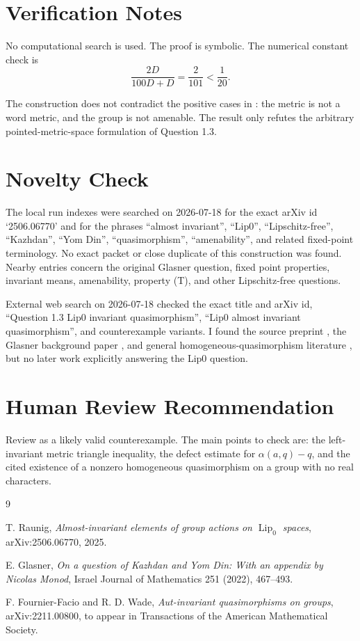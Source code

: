 \documentclass[11pt]{article}
\newcommand{\Lipz}{\operatorname{Lip}_0}
\begin{document}
\section{Verification Notes}

No computational search is used.  The proof is symbolic.  The numerical
constant check is
\[
  \frac{2D}{100D+D}=\frac2{101}<\frac1{20}.
\]

The construction does not contradict the positive cases in
\cite{Raunig2025}: the metric is not a word metric, and the group is not
amenable.  The result only refutes the arbitrary pointed-metric-space
formulation of Question 1.3.

\section{Novelty Check}

The local run indexes were searched on 2026-07-18 for the exact arXiv id
`2506.06770' and for the phrases ``almost invariant'', ``Lip0'',
``Lipschitz-free'', ``Kazhdan'', ``Yom Din'', ``quasimorphism'',
``amenability'', and related fixed-point terminology.  No exact packet or
close duplicate of this construction was found.  Nearby entries concern
the original Glasner question, fixed point properties, invariant means,
amenability, property (T), and other Lipschitz-free questions.

External web search on 2026-07-18 checked the exact title and arXiv id,
``Question 1.3 Lip0 invariant quasimorphism'', ``Lip0 almost invariant
quasimorphism'', and counterexample variants.  I found the source
preprint \cite{Raunig2025}, the Glasner background paper \cite{Glasner2022},
and general homogeneous-quasimorphism literature \cite{FournierFacioWade2023},
but no later work explicitly answering the Lip0 question.

\section{Human Review Recommendation}

Review as a likely valid counterexample.  The main points to check are:
the left-invariant metric triangle inequality, the defect estimate for
$\alpha(a,q)-q$, and the cited existence of a nonzero homogeneous
quasimorphism on a group with no real characters.

\begin{thebibliography}{9}

T. Raunig,
\emph{Almost-invariant elements of group actions on $\Lipz$ spaces},
arXiv:2506.06770, 2025.

E. Glasner,
\emph{On a question of Kazhdan and Yom Din: With an appendix by Nicolas Monod},
Israel Journal of Mathematics 251 (2022), 467--493.

F. Fournier-Facio and R. D. Wade,
\emph{Aut-invariant quasimorphisms on groups},
arXiv:2211.00800, to appear in Transactions of the American Mathematical Society.

\end{thebibliography}
\end{document}
